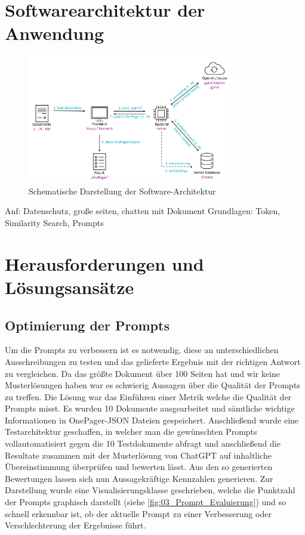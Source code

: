 \section{Softwarearchitektur der Anwendung}

\begin{figure}[h]
    \centering
    \includegraphics[width=0.8\textwidth]{figures/DokumentenAgent-Uebersicht.png}
    \caption{Schematische Darstellung der Software-Architektur}
    \label{fig:DokumentenAgent-uebersicht}    %
\end{figure}

Anf: Datenschutz, große seiten, chatten mit Dokument
Grundlagen: Token, Similarity Search, Prompts

\section{Herausforderungen und Lösungsansätze}

\subsection{Optimierung der Prompts}
Um die Prompts zu verbessern ist es notwendig, diese an unterschiedlichen Ausschreibungen zu testen und das gelieferte 
Ergebnis mit der richtigen Antwort zu vergleichen. Da das größte Dokument über 100 Seiten hat und wir keine Musterlösungen 
haben war es schwierig Aussagen über die Qualität der Prompts zu treffen. Die Lösung war das Einführen einer Metrik welche 
die Qualität der Prompts misst. Es wurden 10 Dokumente ausgearbeitet und sämtliche wichtige Informationen in OnePager-JSON Dateien 
gespeichert. Anschließend wurde eine Testarchitektur geschaffen, in welcher man die gewünschten Prompts vollautomatisiert 
gegen die 10 Testdokumente abfragt und anschließend die Resultate zusammen mit der Musterlösung von ChatGPT auf inhaltliche 
Übereinstimmung überprüfen und bewerten lässt. Aus den so generierten Bewertungen lassen sich nun Aussagekräftige Kennzahlen 
generieren. Zur Darstellung wurde eine Visualisierungsklasse geschrieben, welche die Punktzahl der Prompts graphisch darstellt 
(siehe \ref{fig:03_Prompt_Evaluierung}) und so schnell erkennbar ist, ob der aktuelle Prompt zu einer Verbesserung 
oder Verschlechterung der Ergebnisse führt.

